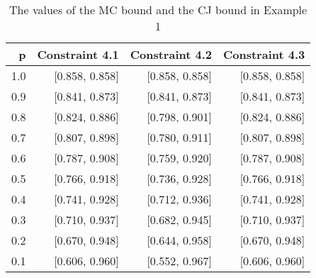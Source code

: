 \begin{table}

\caption{\label{tab:tab2}The values of the MC bound and the CJ bound in Example 1}
\centering
\begin{tabular}[t]{rrrr}
\toprule
p & Constraint 4.1 & Constraint 4.2 & Constraint 4.3\\
\midrule
1.0 & {}[0.858, 0.858] & {}[0.858, 0.858] & {}[0.858, 0.858]\\
\hline
0.9 & {}[0.841, 0.873] & {}[0.841, 0.873] & {}[0.841, 0.873]\\
\hline
0.8 & {}[0.824, 0.886] & {}[0.798, 0.901] & {}[0.824, 0.886]\\
\hline
0.7 & {}[0.807, 0.898] & {}[0.780, 0.911] & {}[0.807, 0.898]\\
\hline
0.6 & {}[0.787, 0.908] & {}[0.759, 0.920] & {}[0.787, 0.908]\\
\hline
0.5 & {}[0.766, 0.918] & {}[0.736, 0.928] & {}[0.766, 0.918]\\
\hline
0.4 & {}[0.741, 0.928] & {}[0.712, 0.936] & {}[0.741, 0.928]\\
\hline
0.3 & {}[0.710, 0.937] & {}[0.682, 0.945] & {}[0.710, 0.937]\\
\hline
0.2 & {}[0.670, 0.948] & {}[0.644, 0.958] & {}[0.670, 0.948]\\
\hline
0.1 & {}[0.606, 0.960] & {}[0.552, 0.967] & {}[0.606, 0.960]\\
\bottomrule
\end{tabular}
\end{table}
